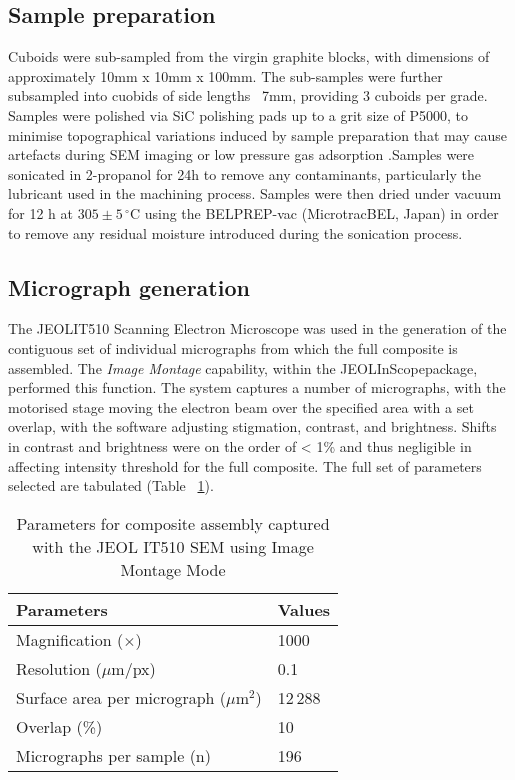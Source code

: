 \documentclass[3p,twocolumn]{elsarticle}
\begin{document}
\subsection{Sample preparation}
Cuboids were sub-sampled from the virgin graphite blocks, with dimensions of
approximately 10mm x 10mm x 100mm. The sub-samples were further subsampled into
cuobids of side lengths ~7mm, providing 3 cuboids per grade. Samples were
polished via SiC polishing pads up to a grit size of P5000, to minimise
topographical variations induced by sample preparation that may cause artefacts
during SEM imaging or low pressure gas adsorption \citep{Fang2022,Jones2018}.Samples were
sonicated in 2-propanol for 24h to remove any contaminants, particularly the
lubricant used in the machining process. Samples were then dried under
vacuum for 12 h at $305 \pm 5\,^\circ\mathrm{C}$ using the BELPREP-vac
(MicrotracBEL, Japan) in order to remove any residual moisture introduced during
the sonication process.

\subsection{Micrograph generation}
The JEOL\texttrademark  IT510 Scanning Electron Microscope was used in the
generation of the contiguous set of individual micrographs from which the full
composite is assembled. The \textit{Image Montage} capability, within the
JEOLInScope\texttrademark  package, performed this function. The system captures
a number of micrographs, with the motorised stage moving the electron beam over
the specified area with a set overlap, with the software adjusting stigmation,
contrast, and brightness. Shifts in contrast and brightness were on the order of
< 1\%  and thus negligible
in affecting intensity threshold for the full composite. The full set of
parameters selected are tabulated (Table ~\ref{tab:microscopy_parameters}).

\begin{table}
  \centering
  \caption{Parameters for composite assembly captured with the JEOL IT510 SEM using Image Montage Mode}
  \label{tab:microscopy_parameters}
    \begin{tabular}{l l}
      \hline
      Parameters & Values \\
      \hline
      Magnification ($\times$)                    & 1000 \\
      Resolution ($\mu$m/px)               & 0.1 \\
      Surface area per micrograph ($\mu$m$^2$) & 12\,288 \\
      Overlap (\%)                          & 10 \\
      Micrographs per sample (n)            & 196 \\
      \hline
    \end{tabular}%
\end{table}
\end{document}
